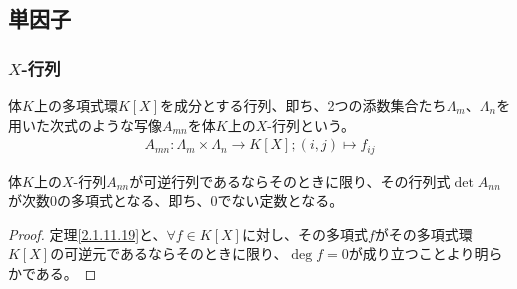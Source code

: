 \documentclass[dvipdfmx]{jsarticle}
\begin{document}
\subsection{単因子}%
\subsubsection{$X$-行列}%
\begin{dfn}
体$K$上の多項式環$K[ X]$を成分とする行列、即ち、2つの添数集合たち$\varLambda_{m}$、$\varLambda_{n}$を用いた次式のような写像$A_{mn}$を体$K$上の$X$-行列という。
\begin{align*}
A_{mn}:\varLambda_{m} \times \varLambda_{n} \rightarrow K[ X];(i,j) \mapsto f_{ij}
\end{align*}
\end{dfn}
\begin{thm}\label{2.2.8.1}
体$K$上の$X$-行列$A_{nn}$が可逆行列であるならそのときに限り、その行列式$\det{A_{nn}}$が次数$0$の多項式となる、即ち、$0$でない定数となる。
\end{thm}
\begin{proof}
定理\ref{2.1.11.19}と、$\forall f \in K[ X]$に対し、その多項式$f$がその多項式環$K[ X]$の可逆元であるならそのときに限り、$\deg f = 0$が成り立つことより明らかである。
\end{proof}
\end{document}
